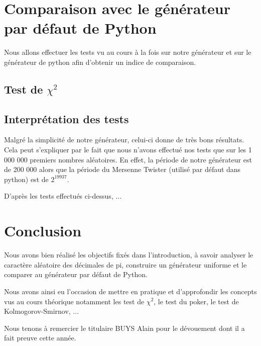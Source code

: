 \documentclass[10pt,a4paper]{article}
\begin{document}
	\newpage
	\section{Comparaison avec le générateur par défaut de Python}
	Nous allons effectuer les tests vu au cours à la fois sur notre générateur et sur le générateur de python afin d'obtenir un indice de comparaison.
	
	\subsection{Test de $\chi^2$}
	
	\newpage
	\subsection{Interprétation des tests}
	Malgré la simplicité de notre générateur, celui-ci donne de très bons résultats. Cela peut s'expliquer par le fait que nous n'avons effectué nos tests que sur les 1 000 000 premiers nombres aléatoires. En effet, la période de notre générateur est de 200 000 alors que la période du Mersenne Twister (utilisé par défaut dans python) est de $2^{19937}$.
	
	D'après les tests effectués ci-dessus, ... %
	
	\newpage
	\section{Conclusion}
	Nous avons bien réalisé les objectifs fixés dans l'introduction, à savoir analyser le caractère aléatoire des décimales de pi, construire un générateur uniforme et le comparer au générateur par défaut de Python.
	
	Nous avons ainsi eu l'occasion de mettre en pratique et d'approfondir les concepts vus au cours théorique notamment les test de $\chi^2$, le test du poker, le test de Kolmogorov-Smirnov, ...
	
	Nous tenons à remercier le titulaire BUYS Alain pour le dévouement dont il a fait preuve cette année.
	
\end{document}
